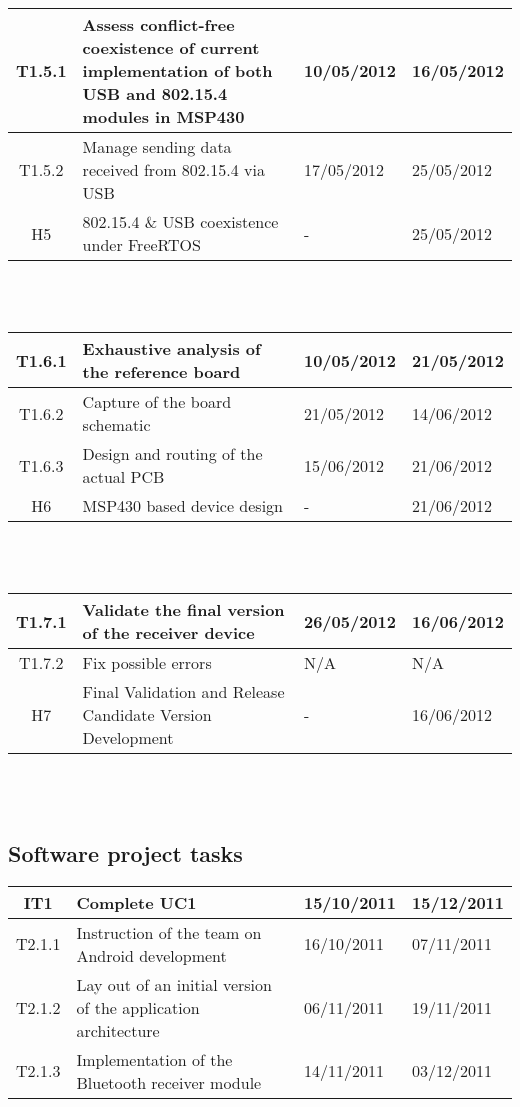 		\begin{tabular}{| c | p{6cm} | l | l |} %
		\hline
T1.5.1 & Assess conflict-free coexistence of current implementation of both USB and 802.15.4 modules in MSP430 & 10/05/2012 & 16/05/2012\\ \hline
T1.5.2 & Manage sending data received from 802.15.4 via USB & 17/05/2012 & 25/05/2012\\ \hline
H5 & 802.15.4 \& USB coexistence under FreeRTOS & - & 25/05/2012\\ \hline
		\end{tabular}\\\\

		\begin{tabular}{| c | p{6cm} | l | l |} %
		\hline
T1.6.1 & Exhaustive analysis of the reference board & 10/05/2012 & 21/05/2012\\ \hline
T1.6.2 & Capture of the board schematic & 21/05/2012 & 14/06/2012\\ \hline
T1.6.3 & Design and routing of the actual PCB & 15/06/2012 & 21/06/2012\\ \hline
H6 & MSP430 based device design & - & 21/06/2012\\ \hline
		\end{tabular}\\\\

		\begin{tabular}{| c | p{6cm} | l | l |} %
		\hline
T1.7.1 & Validate the final version of the receiver device & 26/05/2012 & 16/06/2012\\ \hline
T1.7.2 & Fix possible errors & N/A & N/A \\ \hline
H7 & Final Validation and Release Candidate Version Development & - & 16/06/2012\\
		\hline
		\end{tabular}\\\\

		\newpage
		\subsection{Software project tasks}

		\begin{tabular}{| c | p{6cm} | l | l |} %
		\hline
IT1 & Complete UC1 & 15/10/2011 & 15/12/2011\\ \hline
   T2.1.1 & Instruction of the team on Android development & 16/10/2011 & 07/11/2011\\ \hline
   T2.1.2 & Lay out of an initial version of the application architecture & 06/11/2011 & 19/11/2011\\ 
   T2.1.3 & Implementation of the Bluetooth receiver module & 14/11/2011 & 03/12/2011\\ \hline
		\end{tabular}\\\\

